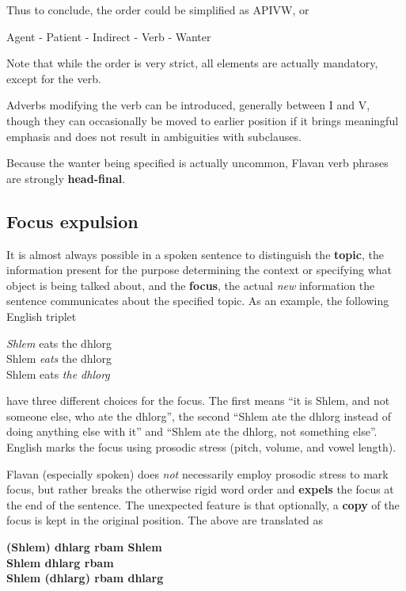 \documentclass[10pt,oneside]{memoir}
\begin{document}
\begin{multicols}{2}
Thus to conclude, the order could be simplified as APIVW, or

\begin{center}
	Agent - Patient - Indirect - Verb - Wanter
\end{center}

Note that while the order is very strict, all elements are actually mandatory, except for the verb.

Adverbs modifying the verb can be introduced, generally between I and V, though they can occasionally be moved to earlier position if it brings meaningful emphasis and does not result in ambiguities with subclauses.

Because the wanter being specified is actually uncommon, Flavan verb phrases are strongly \textbf{head-final}.

\subsection{Focus expulsion}\label{focus}

It is almost always possible in a spoken sentence to distinguish the \textbf{topic}, the information present for the purpose determining the context or specifying what object is being talked about, and the \textbf{focus}, the actual \emph{new} information the sentence communicates about the specified topic. As an example, the following English triplet

\begin{center}
    \emph{Shlem} eats the dhlorg\\
    Shlem \emph{eats} the dhlorg\\
    Shlem eats \emph{the dhlorg}
\end{center}

have three different choices for the focus. The first means ``it is Shlem, and not someone else, who ate the dhlorg'', the second ``Shlem ate the dhlorg instead of doing anything else with it'' and ``Shlem ate the dhlorg, not something else''. English marks the focus using prosodic stress (pitch, volume, and vowel length).

Flavan (especially spoken) does \emph{not} necessarily employ prosodic stress to mark focus, but rather breaks the otherwise rigid word order and \textbf{expels} the focus at the end of the sentence. The unexpected feature is that optionally, a \textbf{copy} of the focus is kept in the original position. The above are translated as

\begin{center}
    \textbf{(Shlem) dhlarg rbam Shlem}\\
    \textbf{Shlem dhlarg rbam}\\
    \textbf{Shlem (dhlarg) rbam dhlarg}
\end{center}


\end{multicols}
\end{document}
